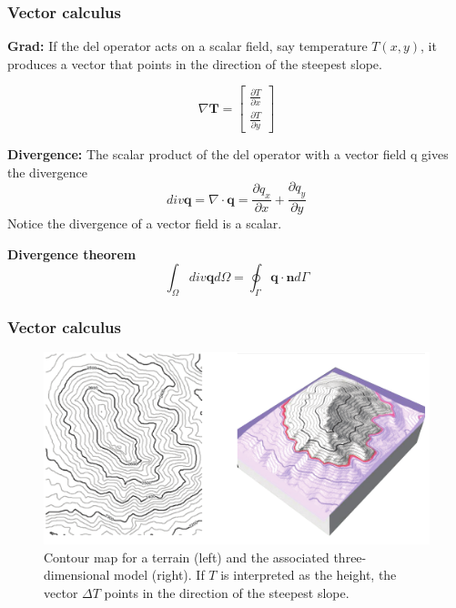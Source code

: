 \documentclass[notes]{beamer}
\begin{document}
\begin{frame}
\frametitle{Vector calculus}


\textbf{Grad:} If the del operator acts on a scalar field, say temperature $T(x, y)$, it produces a vector
that points in the direction of the steepest slope.

\begin{equation*}
	\nabla \mathbf{T} =  
	\begin{bmatrix} 
		\frac{\partial T}{\partial x} \\
		\frac{\partial T}{\partial y}
	\end{bmatrix}
\end{equation*}

\textbf{Divergence:} The scalar product of the del operator with a vector field q gives the divergence
\begin{equation*}
	div \mathbf{q} = \nabla \cdot \mathbf{q} = \frac{\partial q_x}{\partial x} + \frac{\partial q_y}{\partial y}
\end{equation*}
Notice the divergence of a vector field is a scalar.

\textbf{Divergence theorem}
\begin{equation*}
	\int_\Omega div \mathbf{q} d\Omega = \oint_\Gamma \mathbf{q}\cdot \mathbf{n} d\Gamma
\end{equation*}
\end{frame}


\begin{frame}
\frametitle{Vector calculus}
\begin{figure}
	\centering
	\includegraphics[width=\textwidth]{figs/grad-vector.png}
	\caption*{Contour map for a terrain (left) and the associated three-dimensional model (right). If $T$
	is interpreted as the height, the vector $\Delta T$ points in the direction of the steepest slope.}
\end{figure}
\end{frame}
\end{document}
